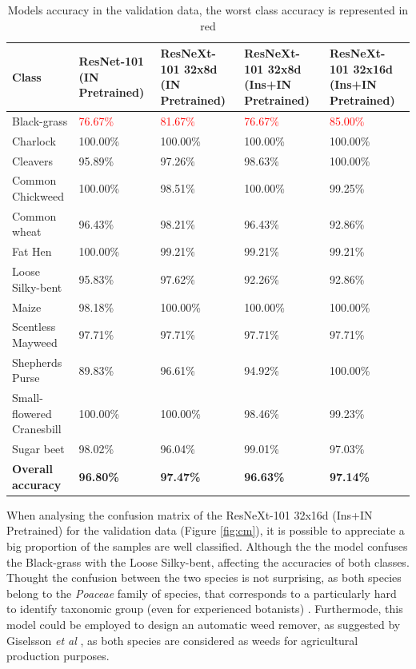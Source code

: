 \documentclass[11pt,onecolumn,titlepage,letterpaper]{article}
\begin{document}
\begin{table}[h]
	\begin{center}
		\begin{tabular}{|p{4.1cm}|p{2.8cm}|p{2.8cm}|p{2.8cm}|p{2.8cm}|}
			\hline
			Class & ResNet-101 (IN Pretrained) & ResNeXt-101 32x8d (IN Pretrained) & ResNeXt-101 32x8d (Ins+IN Pretrained) & ResNeXt-101 32x16d (Ins+IN Pretrained)\\
			\hline\hline
			Black-grass &  \textcolor{red}{76.67\%} &\textcolor{red}{81.67\%}  & \textcolor{red}{76.67\%}  & \textcolor{red}{85.00\%}  \\
			Charlock & 100.00\% & 100.00\% & 100.00\% & 100.00\% \\
			Cleavers & 95.89\% & 97.26\% & 98.63\% & 100.00\%  \\
			Common Chickweed & 100.00\% & 98.51\% & 100.00\% & 99.25\%\\
			Common wheat & 96.43\%  & 98.21\% & 96.43\% & 92.86\%\\
			Fat Hen & 100.00\% & 99.21\% & 99.21\% & 99.21\% \\
			Loose Silky-bent & 95.83\% & 97.62\% & 92.26\% & 92.86\% \\
			Maize & 98.18\% & 100.00\% & 100.00\% & 100.00\% \\
			Scentless Mayweed & 97.71\% & 97.71\% & 97.71\% & 97.71\% \\
			Shepherds Purse & 89.83\% & 96.61\% & 94.92\% & 100.00\% \\
			Small-flowered Cranesbill & 100.00\% & 100.00\% & 98.46\% & 99.23\% \\
			Sugar beet & 98.02\% & 96.04\% & 99.01\% & 97.03\% \\
			\hline
			\textbf{Overall accuracy} & \textbf{96.80\%} & \textbf{97.47\%} & \textbf{96.63\%} & \textbf{97.14\%} \\
			\hline
		\end{tabular}
	\end{center}
	\caption{Models accuracy in the validation data, the worst class accuracy is represented in red}
	\label{table:val}
\end{table}

When analysing the confusion matrix of the ResNeXt-101 32x16d (Ins+IN Pretrained) for the validation data (Figure \ref{fig:cm}), it is possible to appreciate a big proportion of the samples are well classified. Although the the model confuses the Black-grass with the Loose Silky-bent, affecting the accuracies of both classes. Thought the confusion between the two species is not surprising, as both species belong to the \textit{Poaceae} family of species, that corresponds to a particularly hard to identify taxonomic group (even for experienced botanists) \cite{Nesbitt2016}. Furthermode, this model could be employed to design an automatic weed remover, as suggested by Giselsson \textit{et al} \cite{Giselsson2017}, as both species are considered as weeds for agricultural production purposes.
\end{document}
